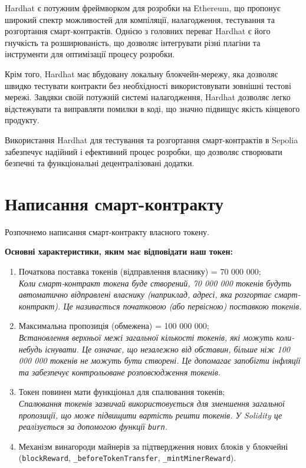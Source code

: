 Hardhat є потужним фреймворком для розробки на Ethereum, що пропонує широкий спектр можливостей для компіляції, налагодження, тестування та розгортання смарт-контрактів. Однією з головних переваг Hardhat є його гнучкість та розширюваність, що дозволяє інтегрувати різні плагіни та інструменти для оптимізації процесу розробки. 

Крім того, Hardhat має вбудовану локальну блокчейн-мережу, яка дозволяє швидко тестувати контракти без необхідності використовувати зовнішні тестові мережі. Завдяки своїй потужній системі налагодження, Hardhat дозволяє легко відстежувати та виправляти помилки в коді, що значно підвищує якість кінцевого продукту. 

Використання Hardhat для тестування та розгортання смарт-контрактів в Sepolia забезпечує надійний і ефективний процес розробки, що дозволяє створювати безпечні та функціональні децентралізовані додатки.

\section{Написання смарт-контракту}

Розпочнемо написання смарт-контракту власного токену.

\vspace{0.5cm}
\textbf{Основні характеристики, яким має відповідати наш токен:}
\begin{enumerate}
    \item Початкова поставка токенів (відправлення власнику) = 70 000 000;\\
    \textit{Коли смарт-контракт токена буде створений, 70 000 000 токенів будуть автоматично відправлені власнику (наприклад, адресі, яка розгортає смарт-контракт). Це називається початковою (або первісною) поставкою токенів.}
    \item Максимальна пропозиція (обмежена) = 100 000 000;\\
    \textit{Встановлення верхньої межі загальної кількості токенів, які можуть коли-небудь існувати. Це означає, що незалежно від обставин, більше ніж 100 000 000 токенів не можуть бути створені. Це допомагає запобігти інфляції та забезпечує контрольоване розповсюдження токенів.}
    \item Токен повинен мати функціонал для спалювання токенів;\\
    \textit{Спалювання токенів зазвичай використовується для зменшення загальної пропозиції, що може підвищити вартість решти токенів. У Solidity це реалізується за допомогою функції \texttt{burn}.}
    \item Механізм винагороди майнерів за підтвердження нових блоків у блокчейні (\texttt{blockReward}, \texttt{\_beforeTokenTransfer}, \texttt{\_mintMinerReward}).
\end{enumerate}

